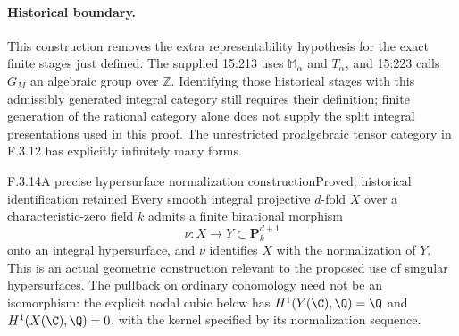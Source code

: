 \paragraph{Historical boundary.}
This construction removes the extra representability hypothesis for the exact finite stages just defined. The supplied 15:213 uses $\mathbb M_\alpha$ and $T_\alpha$, and 15:223 calls $G_M$ an algebraic group over $\mathbb Z$. Identifying those historical stages with this admissibly generated integral category still requires their definition; finite generation of the rational category alone does not supply the split integral presentations used in this proof. The unrestricted proalgebraic tensor category in F.3.12 has explicitly infinitely many forms.

\begin{result}{F.3.14}{A precise hypersurface normalization construction}{Proved; historical identification retained}
Every smooth integral projective $d$-fold $X$ over a characteristic-zero field $k$ admits a finite birational morphism
\[
 \nu:X\longrightarrow Y\subset\mathbf P_k^{d+1}
\]
onto an integral hypersurface, and $\nu$ identifies $X$ with the normalization of $Y$.
This is an actual geometric construction relevant to the proposed use of singular hypersurfaces. The pullback on ordinary cohomology need not be an isomorphism: the explicit nodal cubic below has $H^1(Y(\C),\Q)=\Q$ and $H^1(X(\C),\Q)=0$, with the kernel specified by its normalization sequence.
\end{result}
